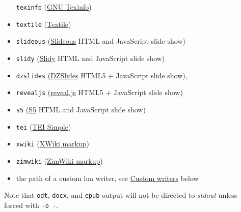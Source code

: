 \documentclass[
]{article}
\begin{document}
\begin{description}
\begin{itemize}
  \texttt{texinfo} (\href{http://www.gnu.org/software/texinfo/}{GNU
  Texinfo})
\item
  \texttt{textile} (\href{http://redcloth.org/textile}{Textile})
\item
  \texttt{slideous}
  (\href{http://goessner.net/articles/slideous/}{Slideous} HTML and
  JavaScript slide show)
\item
  \texttt{slidy} (\href{http://www.w3.org/Talks/Tools/Slidy/}{Slidy}
  HTML and JavaScript slide show)
\item
  \texttt{dzslides} (\href{http://paulrouget.com/dzslides/}{DZSlides}
  HTML5 + JavaScript slide show),
\item
  \texttt{revealjs} (\href{http://lab.hakim.se/reveal-js/}{reveal.js}
  HTML5 + JavaScript slide show)
\item
  \texttt{s5} (\href{http://meyerweb.com/eric/tools/s5/}{S5} HTML and
  JavaScript slide show)
\item
  \texttt{tei} (\href{https://github.com/TEIC/TEI-Simple}{TEI Simple})
\item
  \texttt{xwiki}
  (\href{https://www.xwiki.org/xwiki/bin/view/Documentation/UserGuide/Features/XWikiSyntax/}{XWiki
  markup})
\item
  \texttt{zimwiki}
  (\href{http://zim-wiki.org/manual/Help/Wiki_Syntax.html}{ZimWiki
  markup})
\item
  the path of a custom lua writer, see
  \protect\hyperlink{custom-writers}{Custom writers} below
\end{itemize}

Note that \texttt{odt}, \texttt{docx}, and \texttt{epub} output will not
be directed to \emph{stdout} unless forced with \texttt{-o\ -}.


\end{description}
\end{document}
